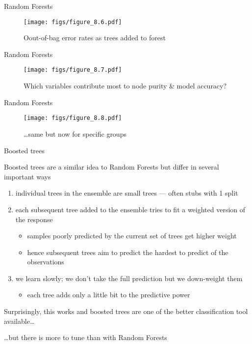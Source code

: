 \documentclass[11pt,ignorenonframetext,compress, aspectratio=169]{beamer}
\providecommand{\tightlist}{%
  \setlength{\itemsep}{0pt}\setlength{\parskip}{0pt}}
\begin{document}
\begin{frame}{Random Forests}

\begin{figure}[htbp]
\centering
\texttt{[image: figs/figure\_8.6.pdf]}
\caption{Oout-of-bag error rates as trees added to forest}
\end{figure}

\end{frame}

\begin{frame}{Random Forests}

\begin{figure}[htbp]
\centering
\texttt{[image: figs/figure\_8.7.pdf]}
\caption{Which variables contribute most to node purity \& model
accuracy?}
\end{figure}

\end{frame}

\begin{frame}{Random Forests}

\begin{figure}[htbp]
\centering
\texttt{[image: figs/figure\_8.8.pdf]}
\caption{\ldots{}same but now for specific groups}
\end{figure}

\end{frame}

\begin{frame}{Boosted trees}

Boosted trees are a similar idea to Random Forests but differ in several
important ways

\begin{enumerate}
\def\labelenumi{\arabic{enumi}.}
\tightlist
\item
  individual trees in the ensemble are small trees --- often stubs with
  1 split
\item
  each subsequent tree added to the ensemble tries to fit a weighted
  version of the response

  \begin{itemize}
  \tightlist
  \item
    samples poorly predicted by the current set of trees get higher
    weight
  \item
    hence subsequent trees aim to predict the hardest to predict of the
    observations
  \end{itemize}
\item
  we learn slowly; we don't take the full prediction but we down-weight
  them

  \begin{itemize}
  \tightlist
  \item
    each tree adds only a little bit to the predictive power
  \end{itemize}
\end{enumerate}

Surprisingly, this works and boosted trees are one of the better
classification tool available\ldots{}

\ldots{}but there is more to tune than with Random Forests

\end{frame}
\end{document}
